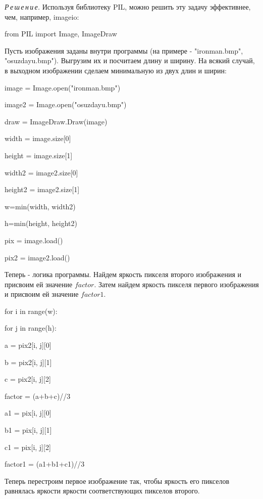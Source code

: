 \documentclass{article}
\newcommand\tab[1][1cm]{\hspace*{#1}}
\begin{document}
 
\textit{Р\,е\,ш\,е\,н\,и\,е.}  Используя библиотеку PIL, можно решить эту задачу эффективнее, чем, например, imageio:

\textsf{from PIL import Image, ImageDraw }

Пусть изображения заданы внутри программы (на примере - "ironman.bmp", "osuzdayu.bmp"). Выгрузим их и посчитаем длину и ширину. На всякий случай, в выходном изображении сделаем минимальную из двух длин и ширин:

{

image = Image.open("ironman.bmp")
 
image2 =  Image.open("osuzdayu.bmp") 

draw = ImageDraw.Draw(image) 

width = image.size[0]  

height = image.size[1]  

width2 = image2.size[0]  

height2 = image2.size[1]  

w=min(width, width2)

h=min(height, height2)	

pix = image.load() 

pix2 = image2.load() }


 Теперь - логика программы. Найдем яркость пикселя второго изображения и присвоим ей значение $factor $. Затем найдем яркость пикселя первого изображения и присвоим ей значение $factor1 $.
 
{

for i in range(w):

\tab[1cm] for j in range(h):

\tab[2cm]		a = pix2[i, j][0] 

\tab[2cm]		b = pix2[i, j][1] 

\tab[2cm]		c = pix2[i, j][2]

\tab[2cm]		factor = (a+b+c)//3


\tab[2cm]		a1 = pix[i, j][0]  

\tab[2cm]		b1 = pix[i, j][1] 

\tab[2cm]		c1 = pix[i, j][2] 

\tab[2cm]		factor1 = (a1+b1+c1)//3
}

\newpage
Теперь перестроим первое изображение так, чтобы яркость его пикселов равнялась яркости яркости соответствующих пикселов второго. 
\end{document}
